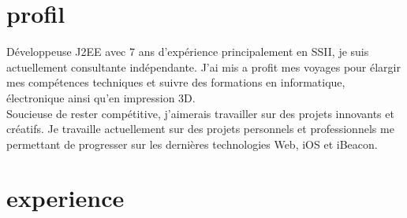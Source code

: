 \documentclass[hidelinks]{friggeri-cv} %
\newcommand{\vcenteredinclude}[1]{\begingroup
\setbox0=\hbox{\texttt{[image: \#1]}}%
\parbox{\wd0}{\box0}\endgroup}
\begin{document}




\section{profil}

Développeuse J2EE avec 7 ans d’expérience principalement en SSII, je suis actuellement consultante indépendante. J'ai mis a profit mes voyages pour élargir mes compétences techniques et suivre des formations en informatique, électronique ainsi qu'en impression 3D. \\
Soucieuse de rester compétitive, j’aimerais travailler sur des projets innovants et créatifs. Je travaille actuellement sur des projets personnels et professionnels me permettant de progresser sur les dernières technologies Web, iOS et iBeacon.\\



\section{experience}
\end{document}
